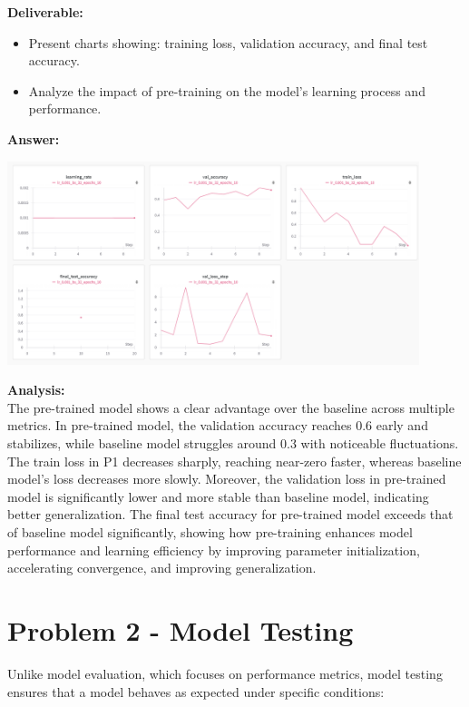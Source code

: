\documentclass[11pt, oneside]{article}   	%
\begin{document}
\noindent\textbf{Deliverable:}
\begin{itemize}
    \item Present charts showing: training loss, validation accuracy, and final test accuracy.
    \item Analyze the impact of pre-training on the model's learning process and performance.
\end{itemize}

\textbf{Answer:} \\
\begin{center}
    \includegraphics[width=0.9\textwidth]{report_pic/PretrainedModel.png}
\end{center}

\textbf{Analysis: }
\\
The pre-trained model shows a clear advantage over the baseline across multiple metrics. In pre-trained model, the validation accuracy reaches 0.6 early and stabilizes, while baseline model struggles around 0.3 with noticeable fluctuations. The train loss in P1 decreases sharply, reaching near-zero faster, whereas baseline model’s loss decreases more slowly. Moreover, the validation loss in  pre-trained model is significantly lower and more stable than baseline model, indicating better generalization. The final test accuracy for pre-trained model exceeds that of baseline model significantly, showing how pre-training enhances model performance and learning efficiency by improving parameter initialization, accelerating convergence, and improving generalization.

\newpage

\section*{Problem 2 - Model Testing}
Unlike model evaluation, which focuses on performance metrics, model testing ensures that a model behaves as expected under specific conditions:
\end{document}
